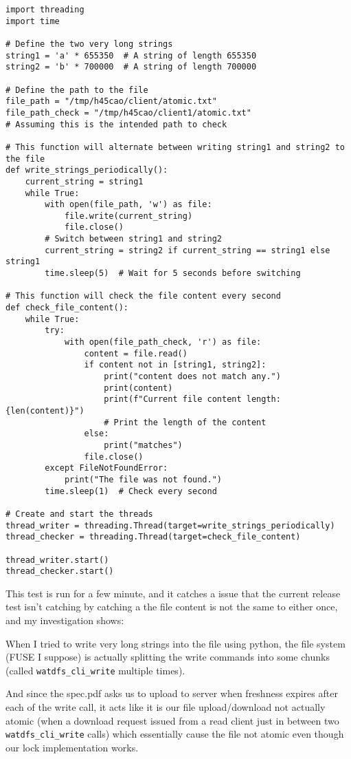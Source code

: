 \documentclass[11pt,a4paper]{article}
\begin{document}
\begin{lstlisting}
import threading
import time

# Define the two very long strings
string1 = 'a' * 655350  # A string of length 655350
string2 = 'b' * 700000  # A string of length 700000

# Define the path to the file
file_path = "/tmp/h45cao/client/atomic.txt"
file_path_check = "/tmp/h45cao/client1/atomic.txt"  
# Assuming this is the intended path to check

# This function will alternate between writing string1 and string2 to the file
def write_strings_periodically():
    current_string = string1
    while True:
        with open(file_path, 'w') as file:
            file.write(current_string)
            file.close()
        # Switch between string1 and string2
        current_string = string2 if current_string == string1 else string1
        time.sleep(5)  # Wait for 5 seconds before switching

# This function will check the file content every second
def check_file_content():
    while True:
        try:
            with open(file_path_check, 'r') as file:
                content = file.read()
                if content not in [string1, string2]:
                    print("content does not match any.")
                    print(content)
                    print(f"Current file content length: {len(content)}")  
                    # Print the length of the content
                else:
                    print("matches")
                file.close()
        except FileNotFoundError:
            print("The file was not found.")
        time.sleep(1)  # Check every second

# Create and start the threads
thread_writer = threading.Thread(target=write_strings_periodically)
thread_checker = threading.Thread(target=check_file_content)

thread_writer.start()
thread_checker.start()
\end{lstlisting}

This  test is run for a few minute, and it catches a issue that the current release test isn't catching by catching a the file content is not the same to either once, and my investigation shows: 

When I tried to write very long strings into the file using python, the file system (FUSE I suppose) is actually splitting the write commands into some chunks (called \texttt{watdfs\_cli\_write} multiple times).

And since the spec.pdf asks us to upload to server when freshness expires after each of the write call, it acts like it is our file upload/download not actually atomic (when a download request issued from a read client just in between two \texttt{watdfs\_cli\_write} calls) which essentially cause the file not atomic even though our lock implementation works.
\end{document}
